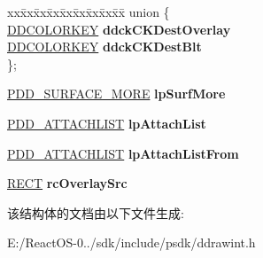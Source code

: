\begin{DoxyCompactItemize}
\begin{tabbing}
\end{tabbing}\item 
\mbox{\label{struct___d_d___s_u_r_f_a_c_e___l_o_c_a_l_a794d70a2454a2b75ef789229846e24ca}} 
\begin{tabbing}
xx\=xx\=xx\=xx\=xx\=xx\=xx\=xx\=xx\=\kill
union \{\\
\>\hyperlink{struct_d_d_c_o_l_o_r_k_e_y}{DDCOLORKEY} {\bfseries ddckCKDestOverlay}\\
\>\hyperlink{struct_d_d_c_o_l_o_r_k_e_y}{DDCOLORKEY} {\bfseries ddckCKDestBlt}\\
\}; \\

\end{tabbing}\item 
\mbox{\label{struct___d_d___s_u_r_f_a_c_e___l_o_c_a_l_aecdc148c85a2bcd01125b46e1f01f9db}} 
\hyperlink{struct___d_d___s_u_r_f_a_c_e___m_o_r_e}{P\+D\+D\+\_\+\+S\+U\+R\+F\+A\+C\+E\+\_\+\+M\+O\+RE} {\bfseries lp\+Surf\+More}
\item 
\mbox{\label{struct___d_d___s_u_r_f_a_c_e___l_o_c_a_l_a6fde37055816fa1584211eece8ade507}} 
\hyperlink{struct___d_d___a_t_t_a_c_h_l_i_s_t}{P\+D\+D\+\_\+\+A\+T\+T\+A\+C\+H\+L\+I\+ST} {\bfseries lp\+Attach\+List}
\item 
\mbox{\label{struct___d_d___s_u_r_f_a_c_e___l_o_c_a_l_a0fdc446e5b3b7ad0021f5f26bc0b37fc}} 
\hyperlink{struct___d_d___a_t_t_a_c_h_l_i_s_t}{P\+D\+D\+\_\+\+A\+T\+T\+A\+C\+H\+L\+I\+ST} {\bfseries lp\+Attach\+List\+From}
\item 
\mbox{\label{struct___d_d___s_u_r_f_a_c_e___l_o_c_a_l_a84ee2b0b764fecea498a8fbfe63a7fd6}} 
\hyperlink{structtag_r_e_c_t}{R\+E\+CT} {\bfseries rc\+Overlay\+Src}
\end{DoxyCompactItemize}


该结构体的文档由以下文件生成\+:\begin{DoxyCompactItemize}
\item 
E\+:/\+React\+O\+S-\/0../sdk/include/psdk/ddrawint.\+h\end{DoxyCompactItemize}
